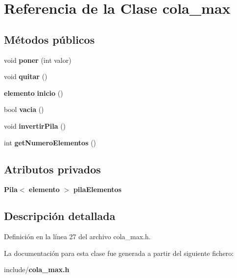 \section{Referencia de la Clase cola\-\_\-max}
\label{classcola__max}
\subsection*{Métodos públicos}
\begin{DoxyCompactItemize}
\item 
void {\bfseries poner} (int valor)\label{classcola__max_af3d5aa7d5cd4b99dc54882d34884ec79}

\item 
void {\bfseries quitar} ()\label{classcola__max_a08669c970f917d3a711f3faf2709ca8d}

\item 
{\bf elemento} {\bfseries inicio} ()\label{classcola__max_a89df5dd70ee8d8eeaf0187a56671f76f}

\item 
bool {\bfseries vacia} ()\label{classcola__max_ae7d8a164394773f287a3c56e3024c654}

\item 
void {\bfseries invertir\-Pila} ()\label{classcola__max_a1bbf4cbe935d3f9fd1d13b44e6c7a184}

\item 
int {\bfseries get\-Numero\-Elementos} ()\label{classcola__max_aab72e5444cd7ba8b04ba35a50e638093}

\end{DoxyCompactItemize}
\subsection*{Atributos privados}
\begin{DoxyCompactItemize}
\item 
{\bf Pila}$<$ {\bf elemento} $>$ {\bfseries pila\-Elementos}\label{classcola__max_a6cbf99d2d400f2e89a95e25ad6dcfbbd}

\end{DoxyCompactItemize}


\subsection{Descripción detallada}


Definición en la línea 27 del archivo cola\-\_\-max.\-h.



La documentación para esta clase fue generada a partir del siguiente fichero\-:\begin{DoxyCompactItemize}
\item 
include/{\bf cola\-\_\-max.\-h}\end{DoxyCompactItemize}
